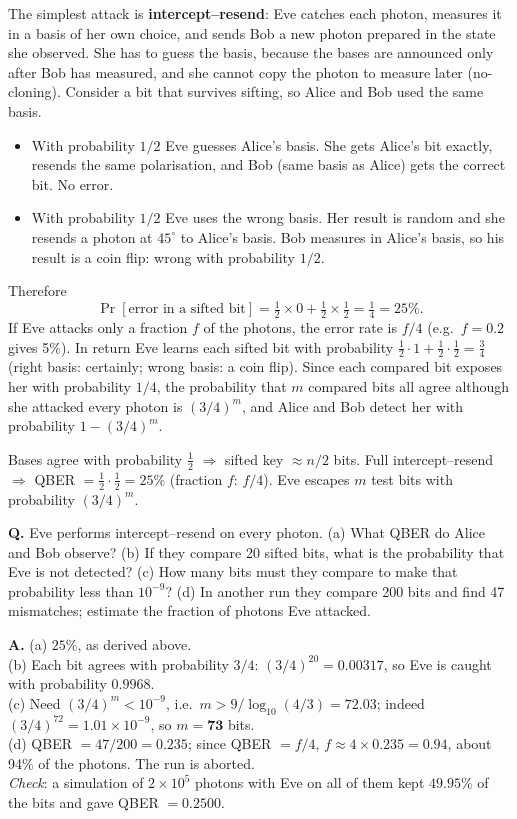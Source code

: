 The simplest attack is \textbf{intercept--resend}: Eve catches each photon, measures it in a basis of her own choice, and sends Bob a new photon prepared in the state she observed. She has to guess the basis, because the bases are announced only after Bob has measured, and she cannot copy the photon to measure later (no-cloning). Consider a bit that survives sifting, so Alice and Bob used the same basis.
\begin{itemize}
  \item With probability $1/2$ Eve guesses Alice's basis. She gets Alice's bit exactly, resends the same polarisation, and Bob (same basis as Alice) gets the correct bit. No error.
  \item With probability $1/2$ Eve uses the wrong basis. Her result is random and she resends a photon at $45^\circ$ to Alice's basis. Bob measures in Alice's basis, so his result is a coin flip: wrong with probability $1/2$.
\end{itemize}
Therefore
\[
\Pr[\text{error in a sifted bit}] = \tfrac12 \times 0 + \tfrac12 \times \tfrac12 = \boxed{\tfrac14 = 25\%}.
\]
If Eve attacks only a fraction $f$ of the photons, the error rate is $f/4$ (e.g.\ $f = 0.2$ gives 5\%). In return Eve learns each sifted bit with probability $\frac12 \cdot 1 + \frac12 \cdot \frac12 = \frac34$ (right basis: certainly; wrong basis: a coin flip). Since each compared bit exposes her with probability $1/4$, the probability that $m$ compared bits all agree although she attacked every photon is $(3/4)^m$, and Alice and Bob detect her with probability $1 - (3/4)^m$.

\begin{mustknow}[: BB84 numbers]
Bases agree with probability $\tfrac12$ $\Rightarrow$ sifted key $\approx n/2$ bits. Full intercept--resend $\Rightarrow$ QBER $= \tfrac12 \cdot \tfrac12 = 25\%$ (fraction $f$: $f/4$). Eve escapes $m$ test bits with probability $(3/4)^m$.
\end{mustknow}

\begin{worked}
\textbf{Q.} Eve performs intercept--resend on every photon. (a) What QBER do Alice and Bob observe? (b) If they compare 20 sifted bits, what is the probability that Eve is not detected? (c) How many bits must they compare to make that probability less than $10^{-9}$? (d) In another run they compare 200 bits and find 47 mismatches; estimate the fraction of photons Eve attacked.

\textbf{A.} (a) $25\%$, as derived above.\\
(b) Each bit agrees with probability $3/4$: $(3/4)^{20} = \mathbf{0.00317}$, so Eve is caught with probability $0.9968$.\\
(c) Need $(3/4)^m < 10^{-9}$, i.e.\ $m > 9 / \log_{10}(4/3) = 72.03$; indeed $(3/4)^{72} = 1.01 \times 10^{-9}$, so $m = \mathbf{73}$ bits.\\
(d) QBER $= 47/200 = 0.235$; since QBER $= f/4$, $f \approx 4 \times 0.235 = \mathbf{0.94}$, about 94\% of the photons. The run is aborted.\\
\emph{Check}: a simulation of $2 \times 10^5$ photons with Eve on all of them kept $49.95\%$ of the bits and gave QBER $= 0.2500$.
\end{worked}


